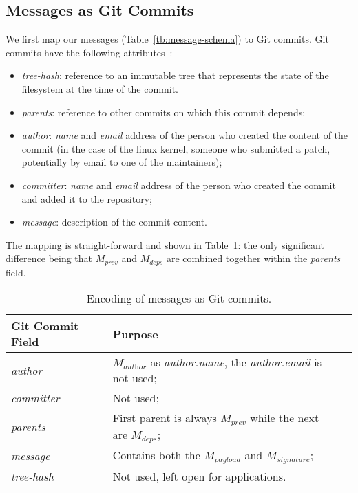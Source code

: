 \documentclass[9pt, oneside]{article}   	%
\begin{document}
\subsection{Messages as Git Commits}

We first map our messages (Table~\ref{tb:message-schema})  to Git commits. Git commits have the following attributes~\cite{git-commit}:
\begin{itemize}
	\item \textit{tree-hash}: reference to an immutable tree that represents the state of the filesystem at the time of the commit. 
	\item \textit{parents}: reference to other commits on which this commit depends;
	\item \textit{author}: \textit{name} and \textit{email} address of the person who created the content of the commit (in the case of the linux kernel, someone who submitted a patch, potentially by email to one of the maintainers);
	\item \textit{committer}: \textit{name} and \textit{email} address of the person who created the commit and added it to the repository;
	\item \textit{message}: description of the commit content.
\end{itemize}

The mapping is straight-forward and shown in Table~\ref{tb:git-commits}: the only significant difference being that $M_\textit{prev}$ and $M_\textit{deps}$ are combined together within the \textit{parents} field.

\begin{table}[ht]
\centering
\caption{Encoding of messages as Git commits.}
\label{tb:git-commits}
\begin{centering}
\begin{tabular}{lll}
\textbf{Git Commit Field}         & \textbf{Purpose} \\ \hline
\textit{author} 		      	      &  $M_\textit{author}$ as \textit{author.name}, the \textit{author.email} is not used;      \\
\textit{committer}                     & Not used;           \\
\textit{parents}    	   	      & First parent is always $M_\textit{prev}$ while the next are $M_\textit{deps}$;           \\
\textit{message}  	  	      &  Contains both the $M_\textit{payload}$ and $M_\textit{signature}$; \\
\textit{tree-hash}  		      & Not used, left open for applications.                             
\end{tabular}
\newline
\end{centering}
\end{table}
\end{document}
